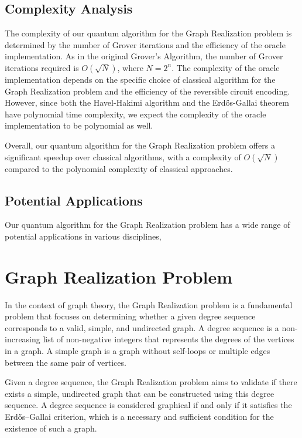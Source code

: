 \subsection{Complexity Analysis}

The complexity of our quantum algorithm for the Graph Realization problem is determined by the number of Grover iterations and the efficiency of the oracle implementation. As in the original Grover's Algorithm, the number of Grover iterations required is $O(\sqrt{N})$, where $N = 2^n$. The complexity of the oracle implementation depends on the specific choice of classical algorithm for the Graph Realization problem and the efficiency of the reversible circuit encoding. However, since both the Havel-Hakimi algorithm and the Erdős-Gallai theorem have polynomial time complexity, we expect the complexity of the oracle implementation to be polynomial as well.

Overall, our quantum algorithm for the Graph Realization problem offers a significant speedup over classical algorithms, with a complexity of $O(\sqrt{N})$ compared to the polynomial complexity of classical approaches.

\subsection{Potential Applications}

Our quantum algorithm for the Graph Realization problem has a wide range of potential applications in various disciplines,

\section{Graph Realization Problem}

In the context of graph theory, the Graph Realization problem is a fundamental problem that focuses on determining whether a given degree sequence corresponds to a valid, simple, and undirected graph. A degree sequence is a non-increasing list of non-negative integers that represents the degrees of the vertices in a graph. A simple graph is a graph without self-loops or multiple edges between the same pair of vertices.

Given a degree sequence, the Graph Realization problem aims to validate if there exists a simple, undirected graph that can be constructed using this degree sequence. A degree sequence is considered graphical if and only if it satisfies the Erdős–Gallai criterion, which is a necessary and sufficient condition for the existence of such a graph.

